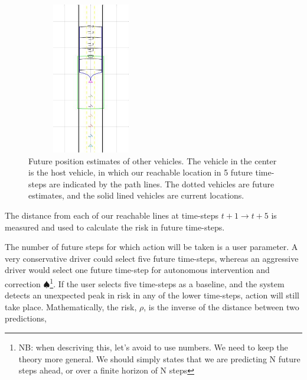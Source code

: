 \documentclass[conference]{IEEEtran}
\newcommand\NB[1]{$\spadesuit$\footnote{NB: #1}}
\begin{document}
\begin{figure}[ht]
    \includegraphics[height = 250,width=0.5\textwidth]{lanesandrisk.jpg}
    \caption{Future position estimates of other vehicles. The vehicle in the center is the host vehicle, in which our reachable location in 5 future time-steps are indicated by the path lines. The dotted vehicles are future estimates, and the solid lined vehicles are current locations.}
    \label{fig:riskway}
\end{figure}
The distance from each of our reachable lines at time-steps $t+1 \to t+5$ is measured and used to calculate the risk in future time-steps.

The number of future steps for which action will be taken is a user parameter. A very conservative driver could select five future time-steps, whereas an aggressive driver would select one future time-step for autonomous intervention and correction \NB{when descriving this, let's avoid to use numbers. We need to keep the theory more general. We should simply states that we are predicting N future steps ahead, or over a finite horizon of N steps}. If the user selects five time-steps as a baseline, and the system detects an unexpected peak in risk in any of the lower time-steps, action will still take place. Mathematically, the risk, $\rho$, is the inverse of the distance between two predictions,
\end{document}
